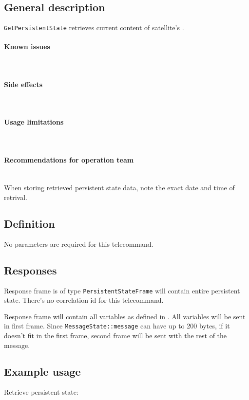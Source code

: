 

\subsection{General description}
\texttt{GetPersistentState} retrieves current content of satellite's . 

\paragraph{Known issues} \mbox{} \\
\None

\paragraph{Side effects} \mbox{} \\
\None

\paragraph{Usage limitations} \mbox{} \\
\None

\paragraph{Recommendations for operation team} \mbox{} \\
When storing retrieved persistent state data, note the exact date and time of retrival. 

\subsection{Definition}

No parameters are required for this telecommand.

\subsection{Responses}

Response frame is of type \texttt{PersistentStateFrame} will contain entire persistent state. There's no correlation id for this telecommand.

Response frame will contain all variables as defined in . All variables will be sent in first frame. Since \texttt{MessageState::message} can have up to 200 bytes, if it doesn't fit in the first frame, second frame will be sent with the rest of the message.

\subsection{Example usage}
Retrieve persistent state:
